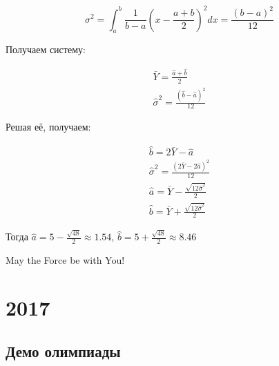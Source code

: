 \documentclass[addpoints, answers]{exam} %
\begin{document}
\begin{questions}
\begin{parts}
\begin{solution}
\[
  \sigma^2 = \int_a^b \frac{1}{b-a} \left(x-\frac{a+b}{2}\right)^2 dx = \frac{(b-a)^2}{12}
\]

Получаем систему:

\[
  \begin{array}{l}
	\bar Y = \frac{\hat a+ \hat b}{2} \\
	\hat\sigma^2 = \frac{(\hat b- \hat a)^2}{12}
  \end{array}
\]

Решая её, получаем:

\[
	\begin{array}{l}
	\hat b = 2 \bar Y - \hat a \\
	\hat\sigma^2 = \frac{(2 \bar Y-2\hat a)^2}{12} \\
	\hat a = \bar Y - \frac{\sqrt{12 \hat\sigma^2}}{2} \\
	\hat b = \bar Y + \frac{\sqrt{12 \hat\sigma^2}}{2}
  \end{array}
\]

Тогда $\hat{a} = 5 - \frac{\sqrt{48}}{2} \approx 1.54$, $\hat{b} = 5 + \frac{\sqrt{48}}{2} \approx 8.46$

\end{solution}


\end{parts}





\end{questions}


\begin{flushright}
May the Force be with You!
\end{flushright}

\section{2017}

\subsection{Демо олимпиады}
\end{document}
